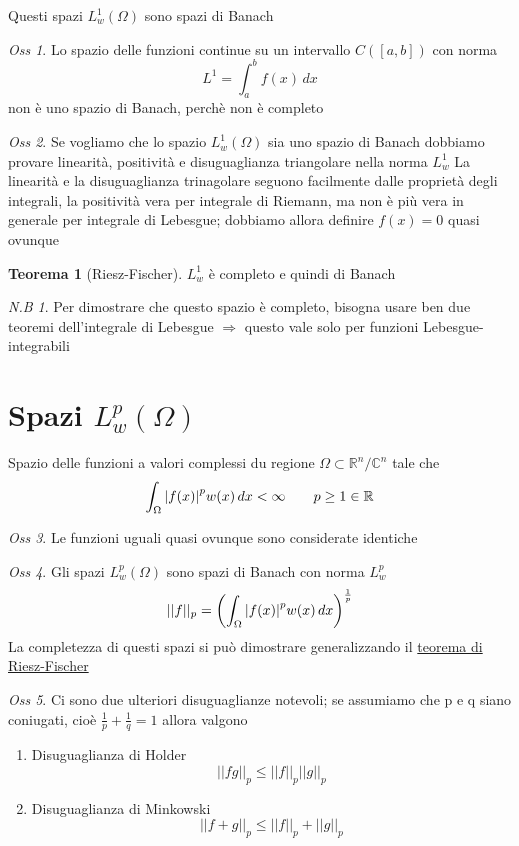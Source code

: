 \documentclass[a4paper,11pt]{report}
\theoremstyle{remark}
\newtheorem*{oss}{Oss}
\newtheorem*{nb}{N.B}
\theoremstyle{definition}
\newtheorem*{teo}{Teorema}
\newcommand{\C}{\mathbb{C}}
\newcommand{\R}{\mathbb{R}}
\DeclarePairedDelimiter{\abs}{\lvert}{\rvert}
\begin{document}
\noindent Questi spazi $L^1_w(\Omega)$ sono spazi di Banach 

\begin{oss}
	Lo spazio delle funzioni continue su un intervallo $C([a,b])$ con norma 
	\[L^1 = \int_a^b f(x) \, dx \]
	non è uno spazio di Banach, perchè non è completo 
\end{oss}

\begin{oss}
	Se vogliamo che lo spazio $L^1_w(\Omega)$ sia uno spazio di Banach dobbiamo provare linearità, positività e disuguaglianza triangolare nella norma $L^1_w$ \newline
	La linearità e la disuguaglianza trinagolare seguono facilmente dalle proprietà degli integrali, la positività vera per integrale di Riemann, ma non è più vera in generale per integrale di Lebesgue; dobbiamo allora definire $f(x)=0$ quasi ovunque
\end{oss}

\begin{teo}[Riesz-Fischer] \label{teo:riesz}
	$L^1_w$ è completo e quindi di Banach 	
\end{teo}

\begin{nb}
	Per dimostrare che questo spazio è completo, bisogna usare ben due teoremi dell'integrale di Lebesgue $\Rightarrow$ questo vale solo per funzioni Lebesgue-integrabili 
\end{nb}

\section{Spazi \texorpdfstring{$L^p_w(\Omega)$}{U}}
Spazio delle funzioni a valori complessi du regione $\Omega \subset \R^n/\C^n$ tale che 
\[\int_\Omega {\abs{f(x)}}^p w(x)\, dx < \infty \qquad p \ge 1 \in \R \]

\begin{oss}
	Le funzioni uguali quasi ovunque sono considerate identiche
\end{oss}

\begin{oss}
	Gli spazi $L^p_w(\Omega)$ sono spazi di Banach con norma $L^p_w$
	\[||f||_p = {\left(\int_\Omega {\abs{f(x)}}^p w(x) \, dx \right)}^{\frac{1}{p}}\]
	La completezza di questi spazi si può dimostrare generalizzando il \hyperref[teo:riesz]{teorema di Riesz-Fischer}
\end{oss}

\begin{oss}
	Ci sono due ulteriori disuguaglianze notevoli; se assumiamo che p e q siano coniugati, cioè $\frac{1}{p} + \frac{1}{q} = 1$ allora valgono
	\begin{enumerate}
		\item Disuguaglianza di Holder
		\[||fg||_p \le ||f||_p ||g||_p\]
		\item Disuguaglianza di Minkowski
		\[||f+g||_p \le ||f||_p + ||g||_p\]
	\end{enumerate}
\end{oss}
\end{document}
